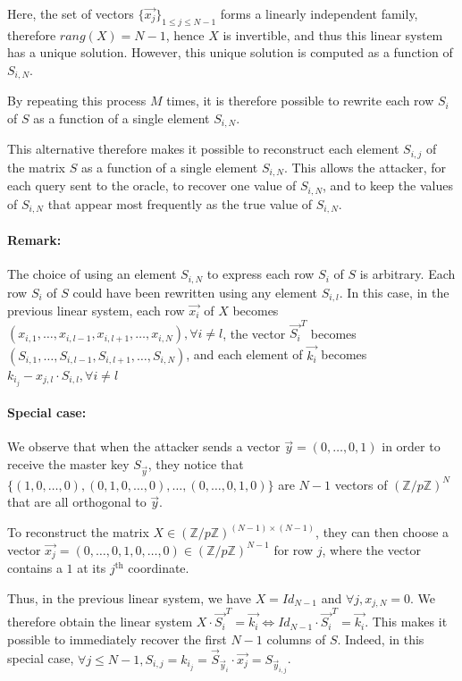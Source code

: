 \documentclass[9pt]{extarticle}
\begin{document}
Here, the set of vectors $\{\vec{x_j}\}_{1 \leq j \leq N-1}$ forms a linearly independent family, therefore $rang(X) = N-1$, hence $X$ is invertible, and thus this linear system has a unique solution. However, this unique solution is computed as a function of $S_{i,N}$.

By repeating this process $M$ times, it is therefore possible to rewrite each row $S_i$ of $S$ as a function of a single element $S_{i,N}$.

This alternative therefore makes it possible to reconstruct each element $S_{i,j}$ of the matrix $S$ as a function of a single element $S_{i,N}$. This allows the attacker, for each query sent to the oracle, to recover one value of $S_{i,N}$, and to keep the values of $S_{i,N}$ that appear most frequently as the true value of $S_{i,N}$.

\paragraph{Remark:} The choice of using an element $S_{i,N}$ to express each row $S_i$ of $S$ is arbitrary. Each row $S_i$ of $S$ could have been rewritten using any element $S_{i,l}$.
In this case, in the previous linear system, each row $\vec{x_i}$ of $X$ becomes $(x_{i,1},\ldots,x_{i,l-1},x_{i,l+1},\ldots,x_{i,N}), \forall i \neq l$, the vector $\vec{S_i}^T$ becomes $(S_{i,1},\ldots,S_{i,l-1},S_{i,l+1},\ldots,S_{i,N})$, and each element of $\vec{k_i}$ becomes $k_{i_j} - x_{j,l} \cdot S_{i,l}, \forall i \neq l$


\paragraph{Special case:} We observe that when the attacker sends a vector $\vec{y} = (0,\ldots,0,1)$ in order to receive the master key $S_{\vec{y}}$, they notice that $\{(1,0,\ldots,0), (0,1,0,\ldots,0), \ldots, (0,\ldots,0,1,0)\}$ are $N-1$ vectors of $(\mathbb{Z}/p\mathbb{Z})^N$ that are all orthogonal to $\vec{y}$.

To reconstruct the matrix $X \in (\mathbb{Z}/p\mathbb{Z})^{(N-1) \times (N-1)}$, they can then choose a vector $\vec{x_j} = (0,\ldots,0,1,0,\ldots,0) \in (\mathbb{Z}/p\mathbb{Z})^{N-1}$ for row $j$, where the vector contains a $1$ at its $j^{\text{th}}$ coordinate.

Thus, in the previous linear system, we have $X = Id_{N-1}$ and $\forall j, x_{j,N} = 0$. We therefore obtain the linear system $X \cdot \vec{S_i}^T = \vec{k_i} \Leftrightarrow Id_{N-1} \cdot \vec{S_i}^T = \vec{k_i}$. This makes it possible to immediately recover the first $N-1$ columns of $S$. Indeed, in this special case, $\forall j \leq N-1, S_{i,j} = k_{i_j} = \vec{S}_{\vec{y}_i} \cdot \vec{x_j} = S_{\vec{y}_{i,j}}$.
\end{document}
